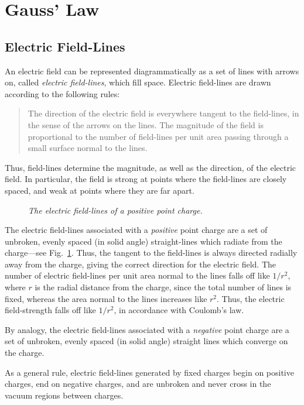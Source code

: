 \section{Gauss' Law}\label{sgauss}
\subsection{Electric Field-Lines}
An electric field can be represented diagrammatically as a set of lines with
arrows on, 
called {\em electric field-lines}, which fill space. Electric field-lines
are drawn  according to the following rules:
\begin{quote}
{\sf The direction of the electric field is everywhere tangent to the field-lines,
in the sense of the arrows on the lines. The magnitude of the field is proportional
to the number of field-lines per unit area passing through a small surface normal to the lines.}
\end{quote}
Thus, field-lines   determine the magnitude,
 as well as the direction, of the electric field.
In particular, the field
is strong at points where the field-lines are closely spaced, and weak at points
where they are far apart. 

\begin{figure}[h]
\epsfysize=2.5in
\centerline{}
\caption{\em The electric field-lines of a positive point charge.}\label{f4.1}
\end{figure}

The electric field-lines associated with  a {\em positive}\/ point charge are a
set of unbroken, evenly spaced (in solid angle) straight-lines which radiate from the charge---see Fig.~\ref{f4.1}.
Thus, the tangent to the field-lines is always directed radially away from the
charge, giving the correct direction for the electric field. The number
of electric field-lines per unit area normal to
the lines  falls off like $1/r^2$, where $r$ is
the radial distance from the charge, since the total number of lines is fixed,
whereas the area normal to the lines increases like $r^2$. Thus, the electric
field-strength falls off like $1/r^2$,  in accordance with Coulomb's law. 

By analogy, the electric field-lines associated with a {\em negative}\/ point
charge are a set of unbroken, evenly spaced  (in solid angle) straight lines which 
converge on the charge. 

As a general rule, electric field-lines generated by fixed charges begin on positive charges, end on negative
charges, and are unbroken and never cross in the vacuum regions between charges.

